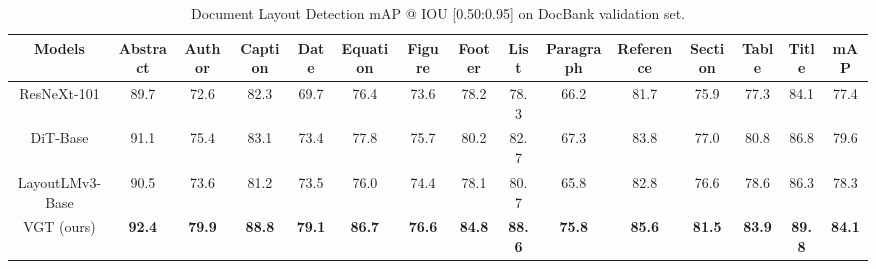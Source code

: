 \documentclass[10pt,twocolumn,letterpaper]{article}
\newcommand{\ra}[1]{\renewcommand{\arraystretch}{#1}}
\begin{document}
\begin{table*}[t]\centering
\small
\setlength{\tabcolsep}{1pt}
\ra{1.2}
\caption{Document Layout Detection mAP @ IOU [0.50:0.95] on DocBank validation set.}
\label{tab:docbank}
\begin{tabular}{|c|c|c|c|c|c|c|c|c|c|c|c|c|c|c|}
\hline
\textbf{Models} & \textbf{Abstract} & \textbf{Author} & \textbf{Caption} & \textbf{Date} & \textbf{Equation} & \textbf{Figure}  &\textbf{Footer} &\textbf{List} & \textbf{Paragraph} &\textbf{Reference}   &\textbf{Section}  & \textbf{Table} &\textbf{Title} & \textbf{mAP} \\
\hline
ResNeXt-101  &89.7 &72.6 &82.3	&69.7 &76.4 &73.6 &78.2 &78.3 &66.2 &81.7 &75.9 &77.3 & 84.1 & 77.4 \\
DiT-Base   &91.1  &75.4  &83.1  &73.4  &77.8  &75.7  &80.2  &82.7  &67.3  &83.8  &77.0 &80.8  &86.8 & 79.6  \\
LayoutLMv3-Base & 90.5  &73.6  &81.2  &73.5  &76.0  &74.4  &78.1 &80.7 &65.8  &82.8  &76.6 &78.6 &86.3 &78.3 \\
\hline
VGT (ours) &\textbf{92.4}   &\textbf{79.9} &\textbf{88.8}  &\textbf{79.1}  &\textbf{86.7}  &\textbf{76.6}  &\textbf{84.8}  &\textbf{88.6}  &\textbf{75.8}  &\textbf{85.6}  &\textbf{81.5} &\textbf{83.9}  &\textbf{89.8}  &\textbf{84.1} \\
\hline
\end{tabular}
\end{table*}
\end{document}
